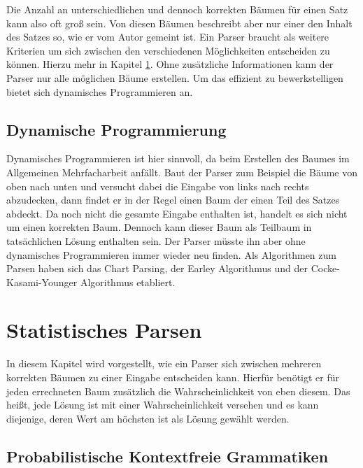 Die Anzahl an unterschiedlichen und dennoch korrekten Bäumen für einen Satz kann also oft groß sein. %
Von diesen Bäumen beschreibt aber nur einer den Inhalt des Satzes so, wie er vom Autor gemeint ist. Ein Parser braucht als weitere Kriterien um sich zwischen den verschiedenen Möglichkeiten entscheiden zu können. Hierzu mehr in Kapitel \ref{sec:nlp:stat-parsen}. Ohne zusätzliche Informationen kann der Parser nur alle möglichen Bäume erstellen. Um das effizient zu bewerkstelligen bietet sich dynamisches Programmieren an. 

\subsection{Dynamische Programmierung}
\label{sec:nlp:syn-parsen:dyn-progr}

Dynamisches Programmieren ist hier sinnvoll, da beim Erstellen des Baumes im Allgemeinen Mehrfacharbeit anfällt. Baut der Parser zum Beispiel die Bäume von oben nach unten und versucht dabei die Eingabe von links nach rechts abzudecken, dann findet er in der Regel einen Baum der einen Teil des Satzes abdeckt. Da noch nicht die gesamte Eingabe enthalten ist, handelt es sich nicht um einen korrekten Baum. Dennoch kann dieser Baum als Teilbaum in tatsächlichen Lösung enthalten sein. Der Parser müsste ihn aber ohne dynamisches Programmieren immer wieder neu finden. Als Algorithmen zum Parsen haben sich das Chart Parsing, der Earley Algorithmus und der Cocke-Kasami-Younger Algorithmus etabliert.

\section{Statistisches Parsen}
\label{sec:nlp:stat-parsen}

In diesem Kapitel wird vorgestellt, wie ein Parser sich zwischen mehreren korrekten Bäumen zu einer Eingabe entscheiden kann. Hierfür benötigt er für jeden errechneten Baum zusätzlich die Wahrscheinlichkeit von eben diesem. Das heißt, jede Lösung ist mit einer Wahrscheinlichkeit versehen und es kann diejenige, deren Wert am höchsten ist als Lösung gewählt werden. %

\subsection{Probabilistische Kontextfreie Grammatiken}
\label{sec:nlp:stat-parsen:pcfg}

